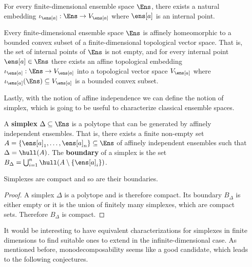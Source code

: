 \begin{coro}
	For every finite-dimensional ensemble space $\Ens$, there exists a natural embedding $\iota_{\ens[a]} : \Ens \to V_{\ens[a]}$ where $\ens[a]$ is an internal point.
\end{coro}

\begin{conj}
	Every finite-dimensional ensemble space $\Ens$ is affinely homeomorphic to a bounded convex subset of a finite-dimensional topological vector space. That is, the set of internal points of $\Ens$ is not empty, and for every internal point $\ens[a] \in \Ens$ there exists an affine topological embedding $\iota_{\ens[a]} : \Ens \to V_{\ens[a]}$ into a topological vector space $V_{\ens[a]}$ where $\iota_{\ens[a]}(\Ens) \subseteq V_{\ens[a]}$ is a bounded convex subset.
\end{conj}

Lastly, with the notion of affine independence we can define the notion of simplex, which is going to be useful to characterize classical ensemble spaces.

\begin{mathSection}
\begin{defn}
	A \textbf{simplex} $\Delta \subseteq \Ens$ is a polytope that can be generated by affinely independent ensembles. That is, there exists a finite non-empty set $A = \{\ens[a]_1, \dots, \ens[a]_n\} \subseteq \Ens$ of affinely independent ensembles such that $\Delta = \hull(A)$. The \textbf{boundary} of a simplex is the set $B_\Delta=\bigcup_{i=1}^{n} \hull(A\setminus\{\ens[a]_i\})$.
\end{defn}

\begin{coro}
	Simplexes are compact and so are their boundaries.
\end{coro}

\begin{proof}
	A simplex $\Delta$ is a polytope and is therefore compact. Its boundary $B_{\Delta}$ is either empty or it is the union of finitely many simplexes, which are compact sets. Therefore $B_{\Delta}$ is compact.
\end{proof}
\end{mathSection}

It would be interesting to have equivalent characterizations for simplexes in finite dimensions to find suitable ones to extend in the infinite-dimensional case. As mentioned before, monodecomposability seems like a good candidate, which leads to the following conjectures.

